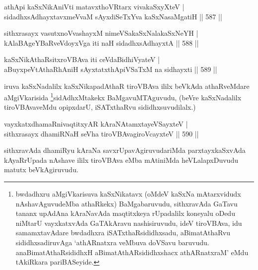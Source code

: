 \begin{shl}
athApi kaSxNikAniVti matavxthoVR\s tarx vivakaSxyXteV | \\
sidadhxsAdhayxtavxmeVvaM sAyxdiSeTxYva kaSxNasaMgatiH \hfill||  587 ||  
\end{shl}
				
\begin{shl}
sithxrasayx vasutxnoV\s vashayxM nimeVSakaSxNalakaSxNeYH | \\
kAlaBAgeYBaRveVdoyxVga iti naH sidadhxsAdhayxtA \hfill||  588 ||  
\end{shl}



\begin{shl}
kaSxNikAthaRsitxroVBAva iti ceVdaBidhiVyateV | \\
aBuyxpeVtAthaRhAniH sAyxtatxthA\s piVSaTxM na sidhayxti \hfill||  589 ||  
\end{shl}

\begin{artha}
iruva kaSxNadalilx kaSxNikapadAthaR tiroVBAva ililx beVkAda athaRveMdare aMgiVkarisida \footnote{bwdadhxru aMgiVkarisuva kaSxNikatavx (oMdeV kaSxNa mAtarxvidudx nAshavAguvudeMba athaRkekx) BaMgabaruvudu, sithxravAda GaTavu tananx upAdAna kAraNavAda maqtitxkeya rUpadalilx koneyalu oDedu niMtarU vayxkatxvAda GaTAkAravu nashisiruvudu, ideV tiroVBAva, idu samamxtavAdare bwdadhxra iSATxthaRsididhxsadu, aBimatAthaRvu sididhxsadiruvAga `athARnatxra veMbuva doVSavu baruvudu. anaBimatAthaRsididhxH aBimatAthARsididhxshacx athARnatxraM' eMdu tAkiRkara pariBASeyide.}sidAdhxMtakekx BaMgavuMTAguvudu, (beVre kaSxNadalilx tiroVBAvaveMdu opipxdarU, iSATxthaRvu sididhxsuvudilalx.)
\end{artha}


\begin{shl}
vayxkatxdhamaRnivaqtitxyAR kAraNAtamxtayeVSayxteV | \\
sithxrasayx dhamiRNaH seVha tiroVBAvagiroVcayxteV \hfill||  590 ||  
\end{shl}

\begin{artha}
sithxravAda dhamiRyu kAraNa savxrUpavAgiruvudariMda parxtayxkaSxvAda kAyaRrUpada nAshave ililx tiroVBAva eMba mAtiniMda heVLalapxDuvudu matutx beVkAgiruvudu.
\end{artha}

